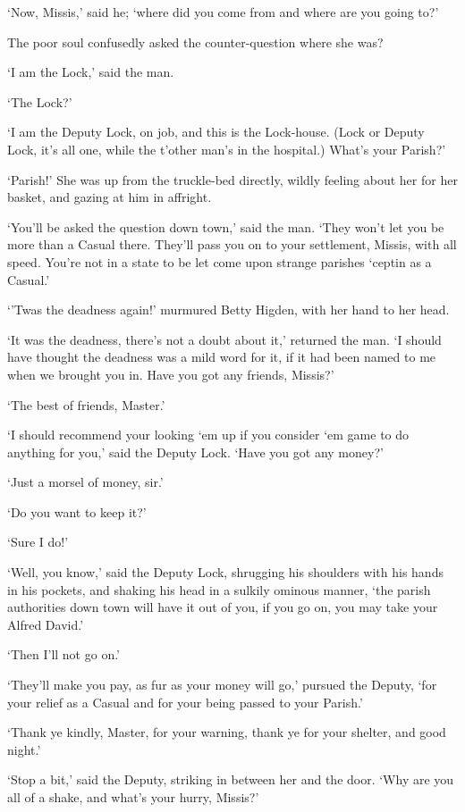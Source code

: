 ‘Now, Missis,’ said he; ‘where did you come from and where are you going
to?’

The poor soul confusedly asked the counter-question where she was?

‘I am the Lock,’ said the man.

‘The Lock?’

‘I am the Deputy Lock, on job, and this is the Lock-house. (Lock or
Deputy Lock, it’s all one, while the t’other man’s in the hospital.)
What’s your Parish?’

‘Parish!’ She was up from the truckle-bed directly, wildly feeling about
her for her basket, and gazing at him in affright.

‘You’ll be asked the question down town,’ said the man. ‘They won’t let
you be more than a Casual there. They’ll pass you on to your settlement,
Missis, with all speed. You’re not in a state to be let come upon
strange parishes ‘ceptin as a Casual.’

‘’Twas the deadness again!’ murmured Betty Higden, with her hand to her
head.

‘It was the deadness, there’s not a doubt about it,’ returned the man.
‘I should have thought the deadness was a mild word for it, if it had
been named to me when we brought you in. Have you got any friends,
Missis?’

‘The best of friends, Master.’

‘I should recommend your looking ‘em up if you consider ‘em game to do
anything for you,’ said the Deputy Lock. ‘Have you got any money?’

‘Just a morsel of money, sir.’

‘Do you want to keep it?’

‘Sure I do!’

‘Well, you know,’ said the Deputy Lock, shrugging his shoulders with his
hands in his pockets, and shaking his head in a sulkily ominous manner,
‘the parish authorities down town will have it out of you, if you go on,
you may take your Alfred David.’

‘Then I’ll not go on.’

‘They’ll make you pay, as fur as your money will go,’ pursued the
Deputy, ‘for your relief as a Casual and for your being passed to your
Parish.’

‘Thank ye kindly, Master, for your warning, thank ye for your shelter,
and good night.’

‘Stop a bit,’ said the Deputy, striking in between her and the door.
‘Why are you all of a shake, and what’s your hurry, Missis?’


